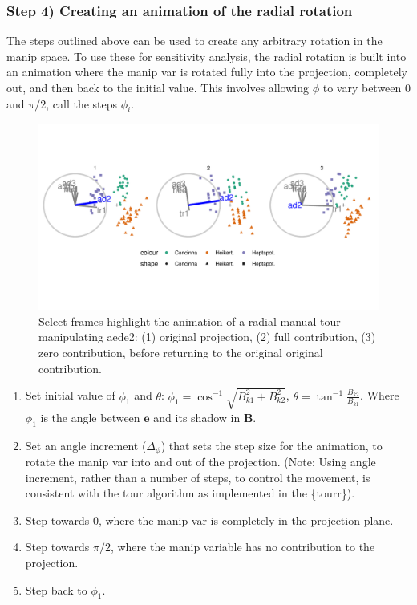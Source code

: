 \documentclass{template/monashthesis}
\begin{document}
\hypertarget{step-4-creating-an-animation-of-the-radial-rotation}{%
\subsubsection{Step 4) Creating an animation of the radial rotation}\label{step-4-creating-an-animation-of-the-radial-rotation}}

The steps outlined above can be used to create any arbitrary rotation in the manip space. To use these for sensitivity analysis, the radial rotation is built into an animation where the manip var is rotated fully into the projection, completely out, and then back to the initial value. This involves allowing \(\phi\) to vary between \(0\) and \(\pi/2\), call the steps \(\phi_i\).

\begin{figure}

{\centering \includegraphics[width=1\linewidth,]{./figures_from_script/ch3_fig3_filmstrip} 

}

\caption{Select frames highlight the animation of a radial manual tour manipulating aede2: (1) original projection, (2) full contribution, (3) zero contribution, before returning to the original original contribution.}\label{fig:ch3fig3}
\end{figure}

\begin{enumerate}
\def\labelenumi{\arabic{enumi}.}
\tightlist
\item
  Set initial value of \(\phi_1\) and \(\theta\): \(\phi_1 = \cos^{-1}{\sqrt{B_{k1}^2+B_{k2}^2}}\), \(\theta = \tan^{-1}\frac{B_{k2}}{B_{k1}}\). Where \(\phi_1\) is the angle between \(\textbf{e}\) and its shadow in \(\textbf{B}\).
\item
  Set an angle increment (\(\Delta_\phi\)) that sets the step size for the animation, to rotate the manip var into and out of the projection. (Note: Using angle increment, rather than a number of steps, to control the movement, is consistent with the tour algorithm as implemented in the \{tourr\}).
\item
  Step towards \(0\), where the manip var is completely in the projection plane.
\item
  Step towards \(\pi/2\), where the manip variable has no contribution to the projection.
\item
  Step back to \(\phi_1\).
\end{enumerate}
\end{document}
